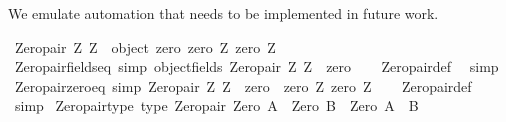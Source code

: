 \begin{isabellebody}
\begin{isamarkuptext}
We emulate automation that needs to be implemented in future work.%
\end{isamarkuptext}\isamarkuptrue%
\isamarkupfalse%
\ {\isachardoublequoteopen}Zero{\isacharunderscore}{\kern0pt}pair\ Z{}\ Z{}\ {\isasymequiv}\ object\ {\isacharbraceleft}{\kern0pt}{\isasymlangle}{\isacharat}{\kern0pt}zero{\isacharcomma}{\kern0pt}\ {\isasymlangle}zero\ Z{}{\isacharcomma}{\kern0pt}\ zero\ Z{}{\isasymrangle}{\isasymrangle}{\isacharbraceright}{\kern0pt}{\isachardoublequoteclose}\isanewline
\isanewline
\isanewline
{}\isamarkupfalse%
\ Zero{\isacharunderscore}{\kern0pt}pair{\isacharunderscore}{\kern0pt}fields{\isacharunderscore}{\kern0pt}eq\ {\isacharbrackleft}{\kern0pt}simp{\isacharbrackright}{\kern0pt}{\isacharcolon}{\kern0pt}\ {\isachardoublequoteopen}object{\isacharunderscore}{\kern0pt}fields\ {\isacharparenleft}{\kern0pt}Zero{\isacharunderscore}{\kern0pt}pair\ Z{}\ Z{}{\isacharparenright}{\kern0pt}\ {\isacharequal}{\kern0pt}\ {\isacharbraceleft}{\kern0pt}{\isacharat}{\kern0pt}zero{\isacharbraceright}{\kern0pt}{\isachardoublequoteclose}\isanewline
%
\isadelimproof
\ \ %
\endisadelimproof
%
\isatagproof
{}\isamarkupfalse%
\ Zero{\isacharunderscore}{\kern0pt}pair{\isacharunderscore}{\kern0pt}def\ \isamarkupfalse%
\ simp%
\endisatagproof
{\isafoldproof}%
%
\isadelimproof
\isanewline
%
\endisadelimproof
\isanewline
{}\isamarkupfalse%
\ Zero{\isacharunderscore}{\kern0pt}pair{\isacharunderscore}{\kern0pt}zero{\isacharunderscore}{\kern0pt}eq\ {\isacharbrackleft}{\kern0pt}simp{\isacharbrackright}{\kern0pt}{\isacharcolon}{\kern0pt}\ {\isachardoublequoteopen}{\isacharparenleft}{\kern0pt}Zero{\isacharunderscore}{\kern0pt}pair\ Z{}\ Z{}{\isacharparenright}{\kern0pt}\ {\isacharat}{\kern0pt}{\isacharat}{\kern0pt}\ zero\ {\isacharequal}{\kern0pt}\ {\isasymlangle}zero\ Z{}{\isacharcomma}{\kern0pt}\ zero\ Z{}{\isasymrangle}{\isachardoublequoteclose}\isanewline
%
\isadelimproof
\ \ %
\endisadelimproof
%
\isatagproof
{}\isamarkupfalse%
\ Zero{\isacharunderscore}{\kern0pt}pair{\isacharunderscore}{\kern0pt}def\ \isamarkupfalse%
\ simp%
\endisatagproof
{\isafoldproof}%
%
\isadelimproof
\isanewline
%
\endisadelimproof
\isanewline
{}\isamarkupfalse%
\ Zero{\isacharunderscore}{\kern0pt}pair{\isacharunderscore}{\kern0pt}type\ {\isacharbrackleft}{\kern0pt}type{\isacharbrackright}{\kern0pt}{\isacharcolon}{\kern0pt}\ {\isachardoublequoteopen}Zero{\isacharunderscore}{\kern0pt}pair{\isacharcolon}{\kern0pt}\ Zero\ A\ {\isasymRightarrow}\ Zero\ B\ {\isasymRightarrow}\ Zero\ {\isacharparenleft}{\kern0pt}A\ {\isasymtimes}\ B{\isacharparenright}{\kern0pt}{\isachardoublequoteclose}\isanewline

\end{isabellebody}
